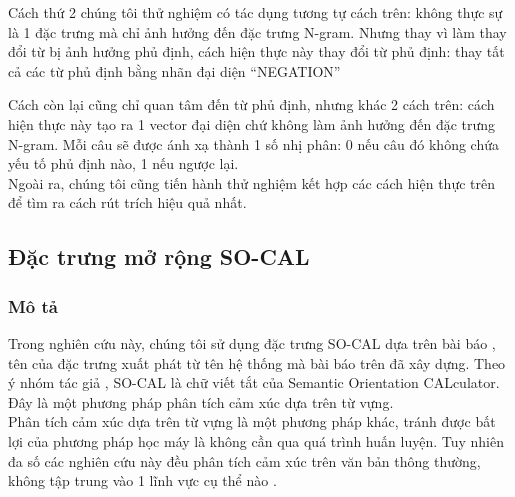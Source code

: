 Cách thứ 2 chúng tôi thử nghiệm có tác dụng tương tự cách trên: không thực sự là 1 đặc trưng mà chỉ ảnh hưởng đến đặc trưng N-gram. Nhưng thay vì làm thay đổi từ bị ảnh hưởng phủ định, cách hiện thực này thay  đổi từ phủ định: thay tất cả các từ phủ định bằng nhãn đại diện ``NEGATION''\\


Cách còn lại cũng chỉ quan tâm đến từ phủ định, nhưng khác 2 cách trên: cách hiện thực này tạo ra 1 vector đại diện chứ không làm ảnh hưởng đến đặc trưng N-gram. Mỗi câu sẽ được ánh xạ thành 1 số nhị phân: 0 nếu câu đó không chứa yếu tố phủ định nào, 1 nếu ngược lại.\\

Ngoài ra, chúng tôi cũng tiến hành thử nghiệm kết hợp các cách hiện thực trên để tìm ra cách rút trích hiệu quả nhất.
\subsection{Đặc trưng mở rộng SO-CAL} \label{sec:socal}
\subsubsection*{Mô tả}
Trong nghiên cứu này, chúng tôi sử dụng đặc trưng SO-CAL dựa trên bài báo \cite{taboada2011lexicon}, tên của đặc trưng xuất phát từ tên hệ thống mà bài báo trên đã xây dựng. Theo ý nhóm tác giả \cite{taboada2011lexicon}, SO-CAL là chữ viết tắt của Semantic Orientation CALculator. Đây là một phương pháp phân tích cảm xúc dựa trên từ vựng.\\

Phân tích cảm xúc dựa trên từ vựng là một phương pháp khác, tránh được bất lợi của phương pháp học máy là không cần qua quá trình huấn luyện. Tuy nhiên đa số các nghiên cứu này đều phân tích cảm xúc trên văn bản thông thường, không tập trung vào 1 lĩnh vực cụ thể nào \cite{taboada2011lexicon,Zhang2011,ohana2009sentiment,Giachanou2016}. \\

